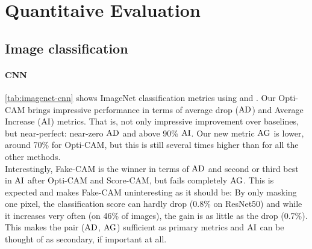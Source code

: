 \section{Quantitaive Evaluation}
\label{sec:oc_quant}

\subsection{Image classification}

\paragraph{CNN}
\autoref{tab:imagenet-cnn} shows ImageNet classification metrics using  and .
 Our Opti-CAM brings impressive performance in terms of average drop ($\operatorname{AD}$) and Average Increase 
 ($\operatorname{AI}$) metrics. That is, not only impressive improvement over baselines, but near-perfect: 
 near-zero $\operatorname{AD}$ and above 90\% $\operatorname{AI}$. Our new metric $\operatorname{AG}$ is lower, around 70\% 
 for Opti-CAM, but this is still several times higher than for all the other methods.\\

\noindent Interestingly, Fake-CAM \autocite{poppi2021revisiting} is the winner in terms of $\operatorname{AD}$ 
and second or third best in $\operatorname{AI}$ after Opti-CAM and Score-CAM, but fails completely $\operatorname{AG}$. This is 
expected and makes Fake-CAM uninteresting as it should be: By only masking one pixel, the 
classification score can hardly drop (0.8\% on ResNet50) and while it increases very often (on 
46\% of images), the gain is as little as the drop (0.7\%). This makes the pair ($\operatorname{AD}$, $\operatorname{AG}$) 
sufficient as primary metrics and $\operatorname{AI}$ can be thought of as secondary, if important at all.\\




